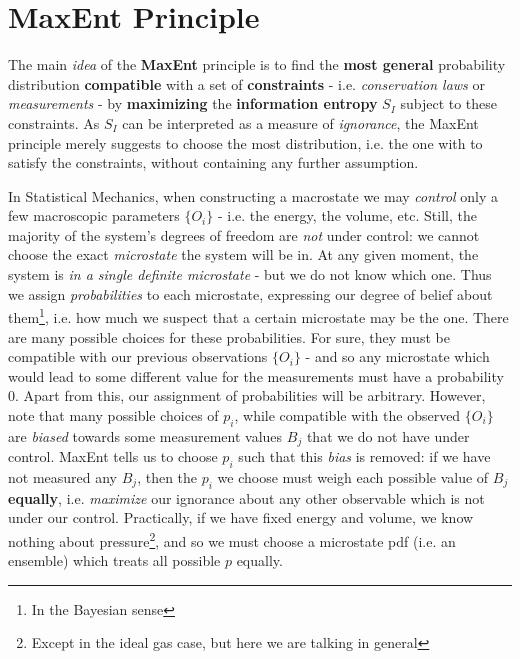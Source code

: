 \documentclass[../../main.tex]{subfiles}
\begin{document}
\section{MaxEnt Principle}
The main \textit{idea} of the \textbf{MaxEnt} principle is to find the \textbf{most general} probability distribution \textbf{compatible} with a set of \textbf{constraints} - i.e. \textit{conservation laws} or \textit{measurements} - by \textbf{maximizing} the \textbf{information entropy} $S_I$ subject to these constraints. As $S_I$ can be interpreted as a measure of \textit{ignorance}, the MaxEnt principle merely suggests to choose the most  distribution, i.e. the one with  to satisfy the constraints, without containing any further assumption. 

\medskip

In Statistical Mechanics, when constructing a macrostate we may \textit{control} only a few macroscopic parameters $\{O_i\}$ - i.e. the energy, the volume, etc. Still, the majority of the system's degrees of freedom are \textit{not} under control: we cannot choose the exact \textit{microstate} the system will be in. At any given moment, the system is \textit{in a single definite microstate} - but we do not know which one. Thus we assign \textit{probabilities} to each microstate, expressing our degree of belief about them\footnote{In the Bayesian sense}, i.e. how much we suspect that a certain microstate may be the  one. There are many possible choices for these probabilities. For sure, they must be compatible with our previous observations $\{O_i\}$ - and so any microstate which would lead to some different value for the measurements must have a probability $0$. Apart from this, our assignment of probabilities will be arbitrary. However, note that many possible choices of $p_i$, while compatible with the observed $\{O_i\}$ are \textit{biased} towards some measurement values $B_j$ that we do not have under control. MaxEnt tells us to choose $p_i$ such that this \textit{bias} is removed: if we have not measured any $B_j$, then the $p_i$ we choose must weigh each possible value of $B_j$ \textbf{equally}, i.e. \textit{maximize} our ignorance about any other observable which is not under our control. Practically, if we have fixed energy and volume, we know nothing about pressure\footnote{Except in the ideal gas case, but here we are talking in general}, and so we must choose a microstate pdf (i.e. an ensemble) which treats all possible $p$ equally. 
\end{document}
